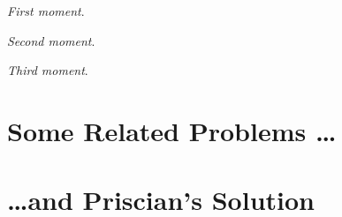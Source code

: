 \documentclass[12pt]{article}
\begin{document}
\emph{First moment}. 

\emph{Second moment}.

\emph{Third moment}.


\section{Some Related Problems \ldots} %
\label{sec:some_related_problems_ldots}


\section{\ldots and Priscian's Solution} %
\label{sec:_ldots_and_priscian_s_solution}





\end{document}
